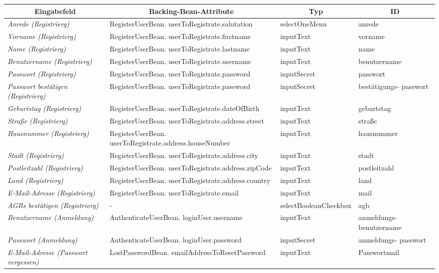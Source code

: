 \begin{itemize}
\begin{itemize}
\begin{center}
\begin{longtable}{|p{3cm} |p{5cm} | p{4cm}|p{3cm}|}
						\hline \multicolumn{1}{|c|}{\textbf{Eingabefeld}} & \multicolumn{1}{|c|}{\textbf{Backing-Bean-Attribute}} & \multicolumn{1}{|c|}{\textbf{Typ}}  &  \multicolumn{1}{|c|}{\textbf{ID}} \\ \hline
						\endfirsthead
						\hline
						\endlastfoot
							\textit{Anrede (Registrierg)} & RegisterUserBean. userToRegistrate.salutation & selectOneMenu & anrede \\ \hline
							\textit{Vorname (Registrierg)} & RegisterUserBean. userToRegistrate.firstname & inputText & vorname \\ \hline
							\textit{Name (Registrierg)} & RegisterUserBean. userToRegistrate.lastname & inputText & name \\ \hline
							\textit{Benutzername (Registrierg)} & RegisterUserBean. userToRegistrate.username & inputText & benutzername\\ \hline
							\textit{Passwort (Registrierg)} & RegisterUserBean. userToRegistrate.password & inputSecret & passwort \\ \hline
							\textit{Passwort bestätigen (Registrierg)} & RegisterUserBean. userToRegistrate.password & inputSecret & bestätigungs- passwort\\ \hline
							\textit{Geburtstag (Registrierg)} & RegisterUserBean. userToRegistrate.dateOfBirth & inputText & geburtstag \\ \hline
							\textit{Straße (Registrierg)} & RegisterUserBean. userToRegistrate.address.street & inputText & straße\\ \hline
							\textit{Hausnummer (Registrierg)} & RegisterUserBean. userToRegistrate.address.houseNumber & inputText & hausnummer\\ \hline
							\textit{Stadt (Registrierg)} & RegisterUserBean. userToRegistrate.address.city & inputText & stadt \\ \hline
							\textit{Postleitzahl (Registrierg)} & RegisterUserBean. userToRegistrate.address.zipCode & inputText & postleitzahl \\ \hline
							\textit{Land (Registrierg)} & RegisterUserBean. userToRegistrate.address.country & inputText & land \\ \hline
							\textit{E-Mail-Adresse (Registrierg)} & RegisterUserBean. userToRegistrate.email & inputText & mail\\ \hline
							\textit{AGBs bestätigen (Registrierg)} & - & selectBooleanCheckbox & agb \\ \hline
							\textit{Benutzername (Anmeldung)} & AuthenticateUserBean. loginUser.username & inputText & anmeldungs- benutzername \\ \hline
							\textit{Passwort (Anmeldung)} & AuthenticateUserBean. loginUser.password & inputSecret & anmeldungs- passwort \\ \hline
							\textit{E-Mail-Adresse (Passwort vergessen)} & LostPasswordBean. emailAddressToResetPassword & inputText & Passwortmail \\ \hline
					\end{longtable}
				\end{center}
				

\end{itemize}
\end{itemize}
